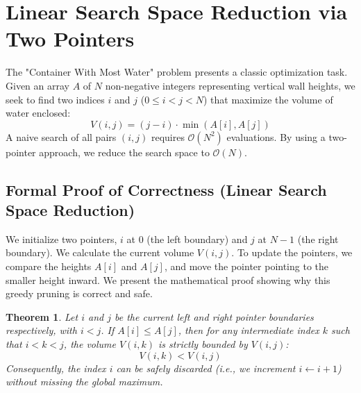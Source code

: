 \documentclass[10pt,journal,compsoc,onecolumn]{IEEEtran}
\newtheorem{theorem}{Theorem}
\begin{document}
\section{Linear Search Space Reduction via Two Pointers}
\label{sec:water}

The "Container With Most Water" problem presents a classic optimization task. Given an array $A$ of $N$ non-negative integers representing vertical wall heights, we seek to find two indices $i$ and $j$ ($0 \le i < j < N$) that maximize the volume of water enclosed:
\begin{equation}
V(i, j) = (j - i) \cdot \min(A[i], A[j])
\end{equation}
A naive search of all pairs $(i, j)$ requires $\mathcal{O}(N^2)$ evaluations. By using a two-pointer approach, we reduce the search space to $\mathcal{O}(N)$.

\subsection{Formal Proof of Correctness (Linear Search Space Reduction)}

We initialize two pointers, $i$ at $0$ (the left boundary) and $j$ at $N-1$ (the right boundary). We calculate the current volume $V(i, j)$. To update the pointers, we compare the heights $A[i]$ and $A[j]$, and move the pointer pointing to the smaller height inward. We present the mathematical proof showing why this greedy pruning is correct and safe.

\begin{theorem}
Let $i$ and $j$ be the current left and right pointer boundaries respectively, with $i < j$. If $A[i] \le A[j]$, then for any intermediate index $k$ such that $i < k < j$, the volume $V(i, k)$ is strictly bounded by $V(i, j)$:
\begin{equation}
V(i, k) < V(i, j)
\end{equation}
Consequently, the index $i$ can be safely discarded (i.e., we increment $i \leftarrow i + 1$) without missing the global maximum.
\end{theorem}
\end{document}
